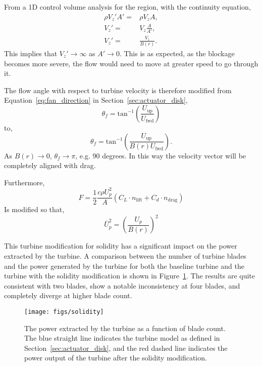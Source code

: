 From a 1D control volume analysis for the region, with the continuity
equation, 
\begin{eqnarray}
 \rho V_z' A' =& \rho V_z A,\\
 V_z' =& V_z \frac{A}{A'}, \\
 V_z' =& \frac{V_z}{B(r)}.
\end{eqnarray}
This implies that $V_z' \rightarrow \infty$ as $A' \rightarrow
0$. This is as expected, as the blockage becomes more severe, the flow
would need to move at greater speed to go through it. 

The flow angle with respect to turbine velocity is therefore modified 
from Equation~\ref{eq:fan_direction} in
Section~\ref{sec:actuator_disk},
\begin{equation}
 \theta_f = \text{tan}^{-1}(\frac{U_{\text{up}}}{U_{\text{fwd}}})
\end{equation}
to,
\begin{equation}
 \theta_f = \text{tan}^{-1}(\frac{U_{\text{up}}}{B(r) U_{\text{fwd}}}). 
\end{equation}
As $B(r) \rightarrow 0$, $\theta_f \rightarrow \pi$, e.g. 90 degrees. In
this way the velocity vector will be completely aligned with drag. 

Furthermore, 
\begin{equation}
 F = \frac{1}{2}\frac{c \rho U_p^2}{A}(C_L \cdot n_{\text{lift}} + C_d \cdot n_{\text{drag}})
\end{equation}
Is modified so that, 
\begin{equation}
 \bar U_p^{2} = \left(\frac{U_p}{B(r)}\right)^2
\end{equation}

This turbine modification for solidity has a significant impact on the
power extracted by the turbine. A comparison between the number of
turbine blades and the power generated by the turbine for both the
baseline turbine and the turbine with the solidity modification is shown in
Figure~\ref{fig:turbine_solidity}. The results are quite consistent with
two blades, show a notable inconsistency at four blades, and completely
diverge at higher blade count. 

  \begin{figure}[!htb]
   \begin{center}
    \texttt{[image: figs/solidity]}
    \caption{The power extracted by the turbine as a function of blade
    count. The blue straight line indicates the turbine model as defined
    in Section~\ref{sec:actuator_disk}, and the red dashed line
    indicates the power output of the turbine after the solidity
    modification.}
    \label{fig:turbine_solidity}
   \end{center}
  \end{figure}

